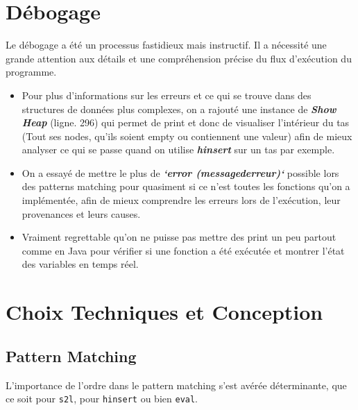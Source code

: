 \documentclass[12pt]{article}
\begin{document}
\section{Débogage}
Le débogage a été un processus fastidieux mais instructif. Il a nécessité une grande attention aux détails et une compréhension précise du flux d'exécution du programme.
\begin{itemize}
    \item Pour plus d'informations sur les erreurs et ce qui se trouve dans des structures de données plus complexes, on a rajouté une instance de \textbf{\textit{Show Heap}} (ligne. 296) qui permet de print et donc de visualiser l'intérieur du tas (Tout ses nodes, qu'ils soient empty ou contiennent une valeur) afin de mieux analyser ce qui se passe quand on utilise \textbf{\textit{hinsert}} sur un tas par exemple.
    \item On a essayé de mettre le plus de\textbf{\textit{ `error (messagederreur)` }}possible lors des patterns matching pour quasiment si ce n'est toutes les fonctions qu'on a implémentée, afin de mieux comprendre les erreurs lors de l'exécution, leur provenances et leurs causes.
\end{itemize}
\begin{itemize}
    \item Vraiment regrettable qu'on ne puisse pas mettre des print un peu partout comme en Java pour vérifier si une fonction a été exécutée et montrer l'état des variables en temps réel.
\end{itemize}


\section{Choix Techniques et Conception}

\subsection{Pattern Matching}
L'importance de l'ordre dans le pattern matching s'est avérée déterminante, que ce soit pour \texttt{s2l}, pour \texttt{hinsert} ou bien \texttt{eval}.
\end{document}
